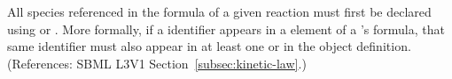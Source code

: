 All species referenced in the \KineticLaw formula of a given reaction must
first be declared using \SpeciesReference or \ModifierSpeciesReference.
More formally, if a \Species identifier appears in a  element of
a \Reaction's \KineticLaw formula, that same identifier must also appear in
at least one \SpeciesReference or \ModifierSpeciesReference in the
\Reaction object definition.  (References: SBML L3V1
Section~\ref{subsec:kinetic-law}.)
